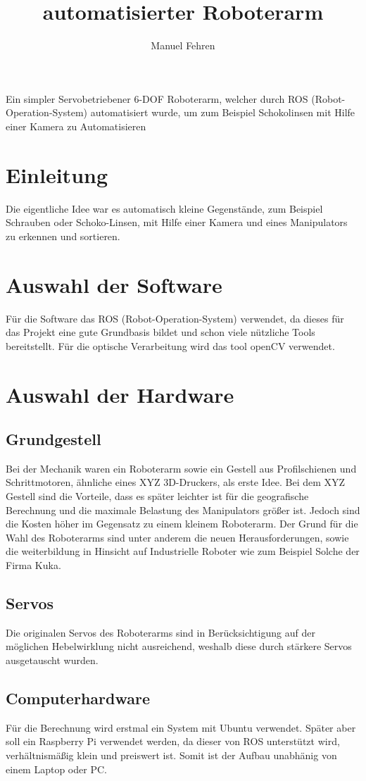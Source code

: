 \documentclass[12pt,a4paper]{article}
\author{Manuel Fehren}
\title{automatisierter Roboterarm}
\begin{document}
\maketitle
\begin{center}
Ein simpler Servobetriebener 6-DOF Roboterarm, welcher durch ROS (Robot-Operation-System) automatisiert wurde, um zum Beispiel Schokolinsen mit Hilfe einer Kamera zu Automatisieren
\end{center}
\newpage
\tableofcontents
\newpage
\section{Einleitung}
Die eigentliche Idee war es automatisch kleine Gegenstände, zum Beispiel Schrauben oder Schoko-Linsen, mit Hilfe einer Kamera und eines Manipulators zu erkennen und sortieren.
\section{Auswahl der Software}
Für die Software das ROS (Robot-Operation-System) verwendet, da dieses für das Projekt eine gute Grundbasis bildet und schon viele nützliche Tools bereitstellt.
Für die optische Verarbeitung wird das tool openCV verwendet.
\section{Auswahl der Hardware}
\subsection{Grundgestell}
Bei der Mechanik waren ein Roboterarm sowie ein Gestell aus Profilschienen und Schrittmotoren, ähnliche eines XYZ 3D-Druckers, als erste Idee.
Bei dem XYZ Gestell sind die Vorteile, dass es später leichter ist für die geografische Berechnung und die maximale Belastung des Manipulators größer ist. Jedoch sind die Kosten höher im Gegensatz zu einem kleinem Roboterarm.
Der Grund für die Wahl des Roboterarms sind unter anderem die neuen Herausforderungen, sowie die weiterbildung in Hinsicht auf Industrielle Roboter wie zum Beispiel Solche der Firma Kuka.
\subsection{Servos}
Die originalen Servos des Roboterarms sind in Berücksichtigung auf der möglichen Hebelwirklung nicht ausreichend, weshalb diese durch stärkere Servos ausgetauscht wurden.
\subsection{Computerhardware}
Für die Berechnung wird erstmal ein System mit Ubuntu verwendet. Später aber soll ein Raspberry Pi verwendet werden, da dieser von ROS unterstützt wird, verhältnismäßig klein und preiswert ist. Somit ist der Aufbau unabhänig von einem Laptop oder PC.
\end{document}
